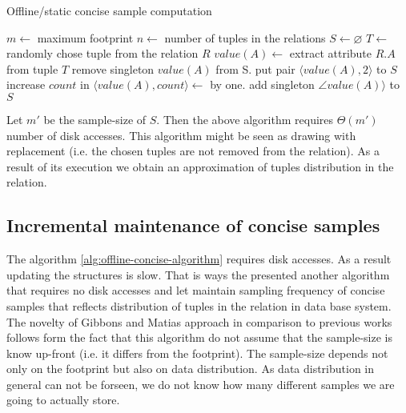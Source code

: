 \begin{algorithm}
  \caption{Offline/static concise sample computation}
  \label{alg:offline-concise-algorithm}
\begin{algorithmic}
  \State $m \gets$ maximum footprint
  \State $n \gets$ number of tuples in the relations
  \State $S \gets  \varnothing$
    \State $T \gets$ randomly chose tuple from the relation $R$
    \State $value(A) \gets$ extract attribute $R.A$ from tuple $T$
        \State remove singleton $value(A)$ from S.
        \State put pair $\langle value(A), 2 \rangle$ to $S$
        \State increase $count$ in $\langle value(A), count
        \rangle \gets$ by one.
    \Else
        \State add singleton $\angle value(A) \rangle$ to $S$
    \EndIf
    \EndWhile
  \end{algorithmic}
\end{algorithm}

Let $m'$ be the sample-size of $S$. Then the above algorithm requires
$\Theta(m')$ number of disk accesses. This algorithm might be seen
as drawing with replacement (i.e. the chosen tuples are
not removed from the relation). As a result of its execution we obtain
an approximation of tuples distribution in the relation.

\subsection{Incremental maintenance of concise samples}
The algorithm \ref{alg:offline-concise-algorithm} requires disk
accesses. As a result updating the structures is slow. That is ways
the \cite{GM98} presented another algorithm that requires no disk
accesses and let maintain sampling frequency of concise samples that
reflects distribution of tuples in the relation in data base system.
The novelty of Gibbons and Matias approach in comparison to previous
works follows form the fact that this algorithm do not assume that
the sample-size is know up-front (i.e. it differs from the footprint).
The sample-size depends not only on the footprint but also on data
distribution. As data distribution in general can not be forseen, we
do not know how many different samples we are going to actually store.

